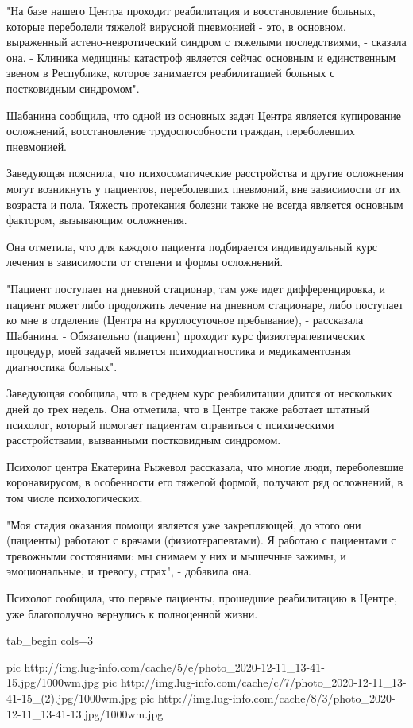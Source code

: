 "На базе нашего Центра проходит реабилитация и восстановление больных, которые
переболели тяжелой вирусной пневмонией - это, в основном, выраженный
астено-невротический синдром с тяжелыми последствиями, - сказала она. - Клиника
медицины катастроф является сейчас основным и единственным звеном в Республике,
которое занимается реабилитацией больных с постковидным синдромом".

Шабанина сообщила, что одной из основных задач Центра является купирование
осложнений, восстановление трудоспособности граждан, переболевших пневмонией.

Заведующая пояснила, что психосоматические расстройства и другие осложнения
могут возникнуть у пациентов, переболевших пневмоний, вне зависимости от их
возраста и пола. Тяжесть протекания болезни также не всегда является основным
фактором, вызывающим осложнения.

Она отметила, что для каждого пациента подбирается индивидуальный курс лечения
в зависимости от степени и формы осложнений.

"Пациент поступает на дневной стационар, там уже идет дифференцировка, и
пациент может либо продолжить лечение на дневном стационаре, либо поступает ко
мне в отделение (Центра на круглосуточное пребывание), - рассказала Шабанина. -
Обязательно (пациент) проходит курс физиотерапевтических процедур, моей задачей
является психодиагностика и медикаментозная диагностика больных".

Заведующая сообщила, что в среднем курс реабилитации длится от нескольких дней
до трех недель. Она отметила, что в Центре также работает штатный психолог,
который помогает пациентам справиться с психическими расстройствами, вызванными
постковидным синдромом.

Психолог центра Екатерина Рыжевол рассказала, что многие люди, переболевшие
коронавирусом, в особенности его тяжелой формой, получают ряд осложнений, в том
числе психологических.

"Моя стадия оказания помощи является уже закрепляющей, до этого они (пациенты)
работают с врачами (физиотерапевтами). Я работаю с пациентами с тревожными
состояниями: мы снимаем у них и мышечные зажимы, и эмоциональные, и тревогу,
страх", - добавила она.

Психолог сообщила, что первые пациенты, прошедшие реабилитацию в Центре, уже
благополучно вернулись к полноценной жизни. 

\ifcmt
tab_begin cols=3

	pic http://img.lug-info.com/cache/5/e/photo_2020-12-11_13-41-15.jpg/1000wm.jpg
	pic http://img.lug-info.com/cache/c/7/photo_2020-12-11_13-41-15_(2).jpg/1000wm.jpg
	pic http://img.lug-info.com/cache/8/3/photo_2020-12-11_13-41-13.jpg/1000wm.jpg

